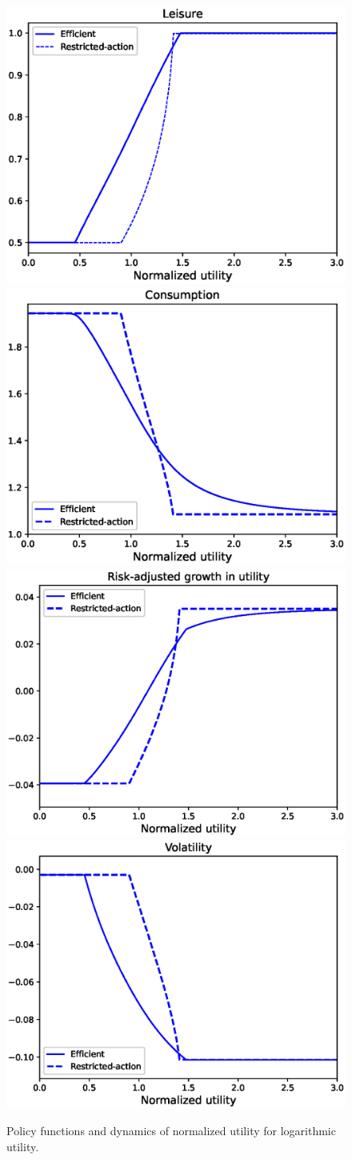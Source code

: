 \documentclass[11pt]{article}
\theoremstyle{plain}
\begin{document}
\begin{figure}[H] %
\centering
\includegraphics[width=0.49\linewidth]{leisure_log}
\includegraphics[width=0.49\linewidth]{consumption_log}
\includegraphics[width=0.49\linewidth]{risk_adj_log}
\includegraphics[width=0.49\linewidth]{sig_u_log}
\caption{Policy functions and dynamics of normalized utility for logarithmic utility.}
\label{fig:l_c_log}
\end{figure}

\iffalse
\end{document}
